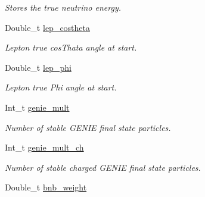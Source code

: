 \begin{DoxyCompactItemize}
\begin{DoxyCompactList}\small\item\em Stores the true neutrino energy. \end{DoxyCompactList}\item 
\hypertarget{classUBXSecEvent_a57ac9edd2e200ea54da22ee278079857}{Double\-\_\-t \hyperlink{classUBXSecEvent_a57ac9edd2e200ea54da22ee278079857}{lep\-\_\-costheta}}\label{classUBXSecEvent_a57ac9edd2e200ea54da22ee278079857}

\begin{DoxyCompactList}\small\item\em Lepton true cos\-Thata angle at start. \end{DoxyCompactList}\item 
\hypertarget{classUBXSecEvent_a7b4229f9ab6a20424bffd9ef5a57edc6}{Double\-\_\-t \hyperlink{classUBXSecEvent_a7b4229f9ab6a20424bffd9ef5a57edc6}{lep\-\_\-phi}}\label{classUBXSecEvent_a7b4229f9ab6a20424bffd9ef5a57edc6}

\begin{DoxyCompactList}\small\item\em Lepton true Phi angle at start. \end{DoxyCompactList}\item 
\hypertarget{classUBXSecEvent_a767300e775e92348238668ef99dfdbc8}{Int\-\_\-t \hyperlink{classUBXSecEvent_a767300e775e92348238668ef99dfdbc8}{genie\-\_\-mult}}\label{classUBXSecEvent_a767300e775e92348238668ef99dfdbc8}

\begin{DoxyCompactList}\small\item\em Number of stable G\-E\-N\-I\-E final state particles. \end{DoxyCompactList}\item 
\hypertarget{classUBXSecEvent_a6a73137488dc2af0dc6abd5868fbbe4d}{Int\-\_\-t \hyperlink{classUBXSecEvent_a6a73137488dc2af0dc6abd5868fbbe4d}{genie\-\_\-mult\-\_\-ch}}\label{classUBXSecEvent_a6a73137488dc2af0dc6abd5868fbbe4d}

\begin{DoxyCompactList}\small\item\em Number of stable charged G\-E\-N\-I\-E final state particles. \end{DoxyCompactList}\item 
\hypertarget{classUBXSecEvent_a38aa9da115c68ecd02cfa2da1f2d50a2}{Double\-\_\-t \hyperlink{classUBXSecEvent_a38aa9da115c68ecd02cfa2da1f2d50a2}{bnb\-\_\-weight}}\label{classUBXSecEvent_a38aa9da115c68ecd02cfa2da1f2d50a2}


\end{DoxyCompactItemize}
